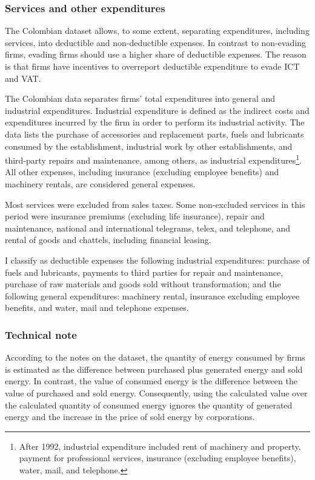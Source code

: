 \documentclass[
  12pt]{article}
\begin{document}
\subsubsection{Services and other
expenditures}\label{services-and-other-expenditures}

The Colombian dataset allows, to some extent, separating expenditures,
including services, into deductible and non-deductible expenses. In
contrast to non-evading firms, evading firms should use a higher share
of deductible expenses. The reason is that firms have incentives to
overreport deductible expenditure to evade ICT and VAT.

The Colombian data separates firms' total expenditures into general and
industrial expenditures. Industrial expenditure is defined as the
indirect costs and expenditures incurred by the firm in order to perform
its industrial activity. The data lists the purchase of accessories and
replacement parts, fuels and lubricants consumed by the establishment,
industrial work by other establishments, and third-party repairs and
maintenance, among others, as industrial expenditures\footnote{After
  1992, industrial expenditure included rent of machinery and property,
  payment for professional services, insurance (excluding employee
  benefits), water, mail, and telephone.}. All other expenses, including
insurance (excluding employee benefits) and machinery rentals, are
considered general expenses.

Most services were excluded from sales taxes. Some non-excluded services
in this period were insurance premiums (excluding life insurance),
repair and maintenance, national and international telegrams, telex, and
telephone, and rental of goods and chattels, including financial
leasing.

I classify as deductible expenses the following industrial expenditures:
purchase of fuels and lubricants, payments to third parties for repair
and maintenance, purchase of raw materials and goods sold without
transformation; and the following general expenditures: machinery
rental, insurance excluding employee benefits, and water, mail and
telephone expenses.

\subsubsection{Technical note}\label{technical-note}

According to the notes on the dataset, the quantity of energy consumed
by firms is estimated as the difference between purchased plus generated
energy and sold energy. In contrast, the value of consumed energy is the
difference between the value of purchased and sold energy. Consequently,
using the calculated value over the calculated quantity of consumed
energy ignores the quantity of generated energy and the increase in the
price of sold energy by corporations.
\end{document}
